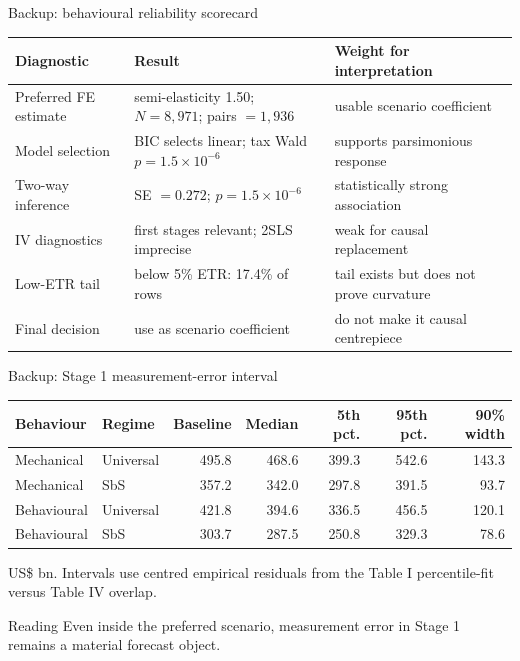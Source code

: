 \documentclass[aspectratio=169, 11pt]{beamer}
\newcommand{\sourceline}[1]{}
\begin{document}
\begin{frame}{Backup: behavioural reliability scorecard}
\small
\begin{center}
\scriptsize
\begin{tabular}{@{}L{3.3cm}L{4.2cm}L{4.2cm}@{}}
  \toprule
  Diagnostic & Result & Weight for interpretation \\
  \midrule
  Preferred FE estimate & semi-elasticity 1.50; $N=8,971$; pairs $=1,936$ & usable scenario coefficient \\
  Model selection & BIC selects linear; tax Wald $p=1.5\times10^{-6}$ & supports parsimonious response \\
  Two-way inference & SE $=0.272$; $p=1.5\times10^{-6}$ & statistically strong association \\
  IV diagnostics & first stages relevant; 2SLS imprecise & weak for causal replacement \\
  Low-ETR tail & below 5\% ETR: 17.4\% of rows & tail exists but does not prove curvature \\
  Final decision & use as scenario coefficient & do not make it causal centrepiece \\
  \bottomrule
\end{tabular}
\end{center}
\sourceline{generated Table stage3\_reliability\_scorecard}
\end{frame}

\begin{frame}{Backup: Stage 1 measurement-error interval}
\small
\begin{center}
\scriptsize
\begin{tabular}{@{}llrrrrr@{}}
  \toprule
  Behaviour & Regime & Baseline & Median & 5th pct. & 95th pct. & 90\% width \\
  \midrule
  Mechanical & Universal & 495.8 & 468.6 & 399.3 & 542.6 & 143.3 \\
  Mechanical & SbS & 357.2 & 342.0 & 297.8 & 391.5 & 93.7 \\
  Behavioural & Universal & 421.8 & 394.6 & 336.5 & 456.5 & 120.1 \\
  Behavioural & SbS & 303.7 & 287.5 & 250.8 & 329.3 & 78.6 \\
  \bottomrule
\end{tabular}
\end{center}
\tiny US\$ bn. Intervals use centred empirical residuals from the Table I percentile-fit versus Table IV overlap.
\begin{block}{Reading}
  Even inside the preferred scenario, measurement error in Stage 1 remains a material forecast object.
\end{block}
\sourceline{generated Table stage1\_measurement\_error\_interval}
\end{frame}
\end{document}
